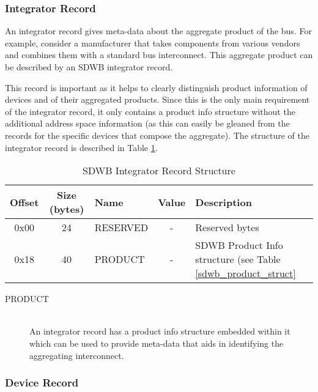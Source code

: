 \documentclass[a4paper, 12pt]{article}
\begin{document}
\subsubsection{Integrator Record}

An integrator record gives meta-data about the aggregate product of the bus. For example, consider
a manufacturer that takes components from various vendors and combines them with a standard bus
interconnect. This aggregate product can be described by an SDWB integrator record.

This record is important as it helps to clearly distinguish product information of devices and of
their aggregated products. Since this is the only main requirement of the integrator record, it
only contains a product info structure without the additional address space information (as this
can easily be gleaned from the records for the specific devices that compose the aggregate). The
structure of the integrator record is described in Table \ref{sdwb_integrator_struct}.

\begin{center}
  \begin{savenotes}
    \begin{table}[!ht]\footnotesize
      \caption{SDWB Integrator Record Structure}\label{sdwb_integrator_struct}\centering
        \begin{tabular}{| c | c | l | c | p{5cm} |} \hline
        Offset & Size (bytes) & Name & Value & Description \\ \hline
        0x00 & 24 & RESERVED & - & Reserved bytes \\ \hline
        0x18 & 40 & PRODUCT & - & SDWB Product Info structure (see Table \ref{sdwb_product_struct} \\ \hline
        \end{tabular}
    \end{table}
  \end{savenotes}
\end{center}

\begin{description}
\item[PRODUCT] \hfill \\
An integrator record has a product info structure embedded within it which can be used
to provide meta-data that aids in identifying the aggregating interconnect.
\end{description}

\subsubsection{Device Record}
\end{document}
